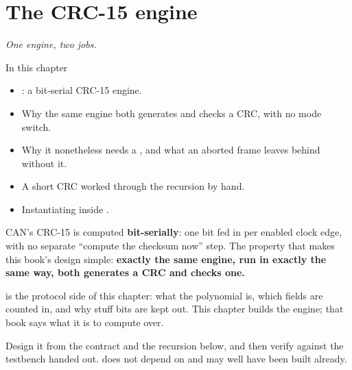 
\chapter{The CRC-15 engine}
\label{c13:ch}

{\large\itshape One engine, two jobs.\par}

\begin{chapterbox}{In this chapter}
\begin{itemize}
  \item {}: a bit-serial CRC-15 engine.
  \item Why the same engine both generates and checks a CRC, with no mode switch.
  \item Why it nonetheless needs a , and what an aborted frame leaves behind without it.
  \item A short CRC worked through the recursion by hand.
  \item Instantiating  inside .
\end{itemize}
\end{chapterbox}

CAN's CRC-15 is computed \textbf{bit-serially}: one bit fed in per enabled clock edge, with no
separate ``compute the checksum now'' step. The property that makes this book's design simple:
\textbf{exactly the same engine, run in exactly the same way, both generates a CRC and checks one.}

 is the protocol side of this chapter: what the polynomial is, which fields are counted in,
and why stuff bits are kept out. This chapter builds the engine; that book says what it is to compute
over.

Design it from the contract and the recursion below, and then verify against the testbench handed
out.  does not depend on  and may well have been built already.




